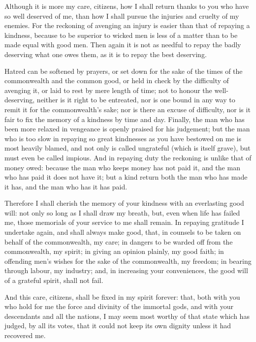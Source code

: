  Although it is more my care, citizens, how I shall return thanks to you who have so well deserved of me, than how I shall pursue the injuries and cruelty of my enemies. For the reckoning of avenging an injury is easier than that of repaying a kindness, because to be superior to wicked men is less of a matter than to be made equal with good men. Then again it is not as needful to repay the badly deserving what one owes them, as it is to repay the best deserving.

 Hatred can be softened by prayers, or set down for the sake of the times of the commonwealth and the common good, or held in check by the difficulty of avenging it, or laid to rest by mere length of time; not to honour the well-deserving, neither is it right to be entreated, nor is one bound in any way to remit it for the commonwealth's sake; nor is there an excuse of difficulty, nor is it fair to fix the memory of a kindness by time and day. Finally, the man who has been more relaxed in vengeance is openly praised for his judgement; but the man who is too slow in repaying so great kindnesses as you have bestowed on me is most heavily blamed, and not only is called ungrateful (which is itself grave), but must even be called impious. And in repaying duty the reckoning is unlike that of money owed: because the man who keeps money has not paid it, and the man who has paid it does not have it; but a kind return both the man who has made it has, and the man who has it has paid.

 Therefore I shall cherish the memory of your kindness with an everlasting good will: not only so long as I shall draw my breath, but, even when life has failed me, those memorials of your service to me shall remain. In repaying gratitude I undertake again, and shall always make good, that, in counsels to be taken on behalf of the commonwealth, my care; in dangers to be warded off from the commonwealth, my spirit; in giving an opinion plainly, my good faith; in offending men's wishes for the sake of the commonwealth, my freedom; in bearing through labour, my industry; and, in increasing your conveniences, the good will of a grateful spirit, shall not fail.

 And this care, citizens, shall be fixed in my spirit forever: that, both with you who hold for me the force and divinity of the immortal gods, and with your descendants and all the nations, I may seem most worthy of that state which has judged, by all its votes, that it could not keep its own dignity unless it had recovered me.
